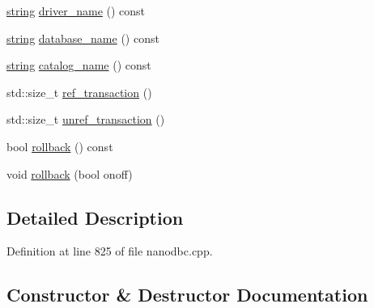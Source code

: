 \begin{DoxyCompactItemize}
\item 
\mbox{\hyperlink{namespacenanodbc_abfc0ece56278e590911ec8352774c212}{string}} \mbox{\hyperlink{classnanodbc_1_1connection_1_1connection__impl_aa181ec6efc9525eedd7970e711a7e0b1}{driver\+\_\+name}} () const
\item 
\mbox{\hyperlink{namespacenanodbc_abfc0ece56278e590911ec8352774c212}{string}} \mbox{\hyperlink{classnanodbc_1_1connection_1_1connection__impl_a3965b626afa21c1a32c2878b00ec2368}{database\+\_\+name}} () const
\item 
\mbox{\hyperlink{namespacenanodbc_abfc0ece56278e590911ec8352774c212}{string}} \mbox{\hyperlink{classnanodbc_1_1connection_1_1connection__impl_a3af94422ff91ff54e39d4d98557ed315}{catalog\+\_\+name}} () const
\item 
std\+::size\+\_\+t \mbox{\hyperlink{classnanodbc_1_1connection_1_1connection__impl_a703c6988170f6083418fd5c6e70bd0ac}{ref\+\_\+transaction}} ()
\item 
std\+::size\+\_\+t \mbox{\hyperlink{classnanodbc_1_1connection_1_1connection__impl_a1bc596d69ce38c3b214f5974f37f6232}{unref\+\_\+transaction}} ()
\item 
bool \mbox{\hyperlink{classnanodbc_1_1connection_1_1connection__impl_ad5076479348cce3edfb0588bc97e7547}{rollback}} () const
\item 
void \mbox{\hyperlink{classnanodbc_1_1connection_1_1connection__impl_ae1d0b098626ddf3b3520a9c77ce48661}{rollback}} (bool onoff)
\end{DoxyCompactItemize}


\subsection{Detailed Description}


Definition at line 825 of file nanodbc.\+cpp.



\subsection{Constructor \& Destructor Documentation}
\mbox{\label{classnanodbc_1_1connection_1_1connection__impl_abf4659ded7b032cca5e6638a66818460}} 
